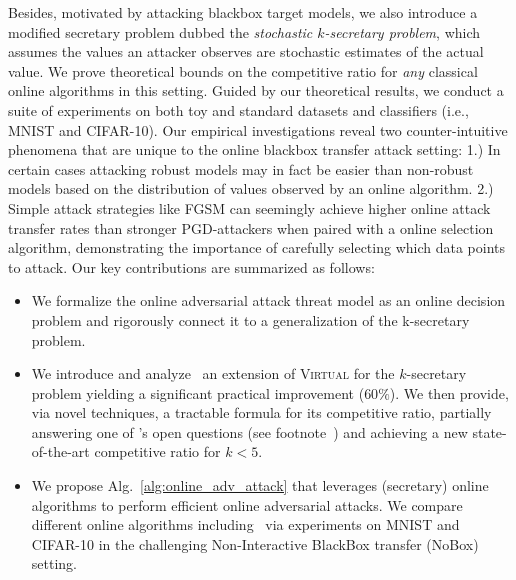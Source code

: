 Besides, motivated by attacking blackbox target models, we also introduce a modified secretary problem dubbed the \textit{stochastic $k$-secretary problem}, which assumes the values an attacker observes are stochastic estimates of the actual value. We prove theoretical bounds on the competitive ratio for \emph{any} classical online algorithms in this setting. Guided by our theoretical results, we conduct a suite of experiments on both toy and standard datasets and classifiers (i.e., MNIST and CIFAR-10). Our empirical investigations reveal two counter-intuitive phenomena that are unique to the online blackbox transfer attack setting: 1.) In certain cases attacking robust models may in fact be easier than non-robust models based on the distribution of values observed by an online algorithm. 2.) Simple attack strategies like FGSM can seemingly achieve higher online attack transfer rates than stronger PGD-attackers when paired with a online selection algorithm, demonstrating the importance of carefully selecting which data points to attack. Our key contributions are summarized as follows:



\begin{itemize}[noitemsep,topsep=0pt,parsep=0pt,partopsep=0pt,label={\large\textbullet},leftmargin=*]
\item We formalize the online adversarial attack threat model as an online decision problem and rigorously connect it to a generalization of the k-secretary problem.
\item We introduce and analyze \algoname\, an extension of \textsc{Virtual} for the $k$-secretary problem yielding a significant practical improvement ($60\%$). %
We then provide, via novel techniques, a tractable formula for its competitive ratio, partially answering one of \citet{albers2020new}'s open questions (see footnote~) and achieving a new state-of-the-art competitive ratio for $k<5$.
\item We propose Alg.~\ref{alg:online_adv_attack} that leverages (secretary) online algorithms to perform efficient online adversarial attacks. We compare different online algorithms including \algoname\ via experiments on MNIST and CIFAR-10 in the challenging Non-Interactive BlackBox transfer (NoBox) setting.%
\end{itemize}

